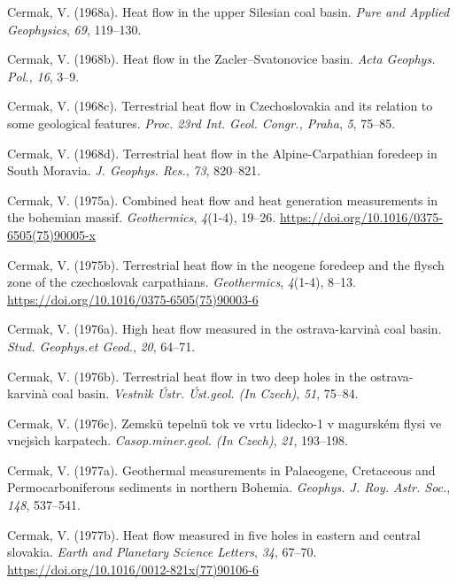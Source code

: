 \begin{CSLReferences}{1}{1}
\leavevmode{}%
Cermak, V. (1968a). Heat flow in the upper {Silesian} coal basin. \emph{Pure and Applied Geophysics}, \emph{69}, 119--130.

\leavevmode{}%
Cermak, V. (1968b). Heat flow in the {Zacler--Svatonovice} basin. \emph{Acta Geophys. Pol.,} \emph{16}, 3--9.

\leavevmode{}%
Cermak, V. (1968c). Terrestrial heat flow in {Czechoslovakia} and its relation to some geological features. \emph{Proc. 23rd Int. Geol. Congr., Praha}, \emph{5}, 75--85.

\leavevmode{}%
Cermak, V. (1968d). Terrestrial heat flow in the {Alpine-Carpathian} foredeep in {South Moravia}. \emph{J. Geophys. Res.}, \emph{73}, 820--821.

\leavevmode{}%
Cermak, V. (1975a). Combined heat flow and heat generation measurements in the bohemian massif. \emph{Geothermics}, \emph{4}(1-4), 19--26. \url{https://doi.org/10.1016/0375-6505(75)90005-x}

\leavevmode{}%
Cermak, V. (1975b). Terrestrial heat flow in the neogene foredeep and the flysch zone of the czechoslovak carpathians. \emph{Geothermics}, \emph{4}(1-4), 8--13. \url{https://doi.org/10.1016/0375-6505(75)90003-6}

\leavevmode{}%
Cermak, V. (1976a). High heat flow measured in the ostrava-karvinà coal basin. \emph{Stud. Geophys.et Geod.}, \emph{20}, 64--71.

\leavevmode{}%
Cermak, V. (1976b). Terrestrial heat flow in two deep holes in the ostrava-karvinà coal basin. \emph{Vestnìk Ústr. Úst.geol. (In Czech)}, \emph{51}, 75--84.

\leavevmode{}%
Cermak, V. (1976c). Zemskü tepelnü tok ve vrtu lidecko-1 v magurském flysi ve vnejsìch karpatech. \emph{Casop.miner.geol. (In Czech)}, \emph{21}, 193--198.

\leavevmode{}%
Cermak, V. (1977a). Geothermal measurements in {Palaeogene, Cretaceous and Permocarboniferous} sediments in northern {Bohemia}. \emph{Geophys. J. Roy. Astr. Soc.}, \emph{148}, 537--541.

\leavevmode{}%
Cermak, V. (1977b). Heat flow measured in five holes in eastern and central slovakia. \emph{Earth and Planetary Science Letters}, \emph{34}, 67--70. \url{https://doi.org/10.1016/0012-821x(77)90106-6}


\end{CSLReferences}
